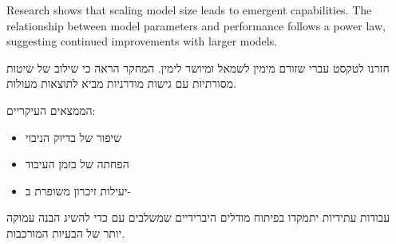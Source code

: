 \documentclass{hebrew-academic-template}
\begin{document}
Research shows that scaling model size leads to emergent capabilities. The relationship between model parameters and performance follows a power law, suggesting continued improvements with larger models.



חזרנו לטקסט עברי שזורם מימין לשמאל ומיושר לימין. המחקר הראה כי שילוב של שיטות  מסורתיות עם גישות  מודרניות מביא לתוצאות מעולות.

הממצאים העיקריים:
\begin{itemize}
\item שיפור של  בדיוק הניבוי
\item הפחתה של  בזמן העיבוד
\item יעילות זיכרון משופרת ב-
\end{itemize}

עבודות עתידיות יתמקדו בפיתוח מודלים היברידיים שמשלבים  עם  כדי להשיג הבנה עמוקה יותר של הבעיות המורכבות.

\newpage
\printhebrewbibliography
\printenglishbibliography
\end{document}

